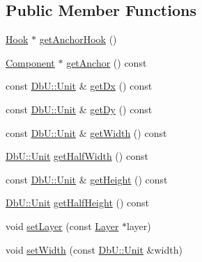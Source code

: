 \subsection*{Public Member Functions}
\begin{DoxyCompactItemize}
\item 
\mbox{\hyperlink{classHurricane_1_1Hook}{Hook}} $\ast$ \mbox{\hyperlink{classHurricane_1_1Contact_a300306b006397377bc9a54ea783c1150}{get\+Anchor\+Hook}} ()
\item 
\mbox{\hyperlink{classHurricane_1_1Component}{Component}} $\ast$ \mbox{\hyperlink{classHurricane_1_1Contact_ab0b327b306bf7ebda634f59d8d0cfd8f}{get\+Anchor}} () const
\item 
const \mbox{\hyperlink{group__DbUGroup_ga4fbfa3e8c89347af76c9628ea06c4146}{Db\+U\+::\+Unit}} \& \mbox{\hyperlink{classHurricane_1_1Contact_acf8405f74b97239ea74ec629d0b4e194}{get\+Dx}} () const
\item 
const \mbox{\hyperlink{group__DbUGroup_ga4fbfa3e8c89347af76c9628ea06c4146}{Db\+U\+::\+Unit}} \& \mbox{\hyperlink{classHurricane_1_1Contact_aa7bc32ab9211fd5f6ad3aacdf1214f20}{get\+Dy}} () const
\item 
const \mbox{\hyperlink{group__DbUGroup_ga4fbfa3e8c89347af76c9628ea06c4146}{Db\+U\+::\+Unit}} \& \mbox{\hyperlink{classHurricane_1_1Contact_a28bd18de9ca6e5cf2b77fce5e22af43a}{get\+Width}} () const
\item 
\mbox{\hyperlink{group__DbUGroup_ga4fbfa3e8c89347af76c9628ea06c4146}{Db\+U\+::\+Unit}} \mbox{\hyperlink{classHurricane_1_1Contact_a4a5136f4e8299435e50db7da28172ca1}{get\+Half\+Width}} () const
\item 
const \mbox{\hyperlink{group__DbUGroup_ga4fbfa3e8c89347af76c9628ea06c4146}{Db\+U\+::\+Unit}} \& \mbox{\hyperlink{classHurricane_1_1Contact_adf6487485a4f48bd15aa6f9a8ac5fd27}{get\+Height}} () const
\item 
\mbox{\hyperlink{group__DbUGroup_ga4fbfa3e8c89347af76c9628ea06c4146}{Db\+U\+::\+Unit}} \mbox{\hyperlink{classHurricane_1_1Contact_aebd3ff8e1368617ab750b20ae9ffb59b}{get\+Half\+Height}} () const
\item 
void \mbox{\hyperlink{classHurricane_1_1Contact_a147644849f33bc4d58b6b997543c8306}{set\+Layer}} (const \mbox{\hyperlink{classHurricane_1_1Layer}{Layer}} $\ast$layer)
\item 
void \mbox{\hyperlink{classHurricane_1_1Contact_aae6d5c96862fd6c834ff4abd61edc86f}{set\+Width}} (const \mbox{\hyperlink{group__DbUGroup_ga4fbfa3e8c89347af76c9628ea06c4146}{Db\+U\+::\+Unit}} \&width)
\item 

\end{DoxyCompactItemize}
